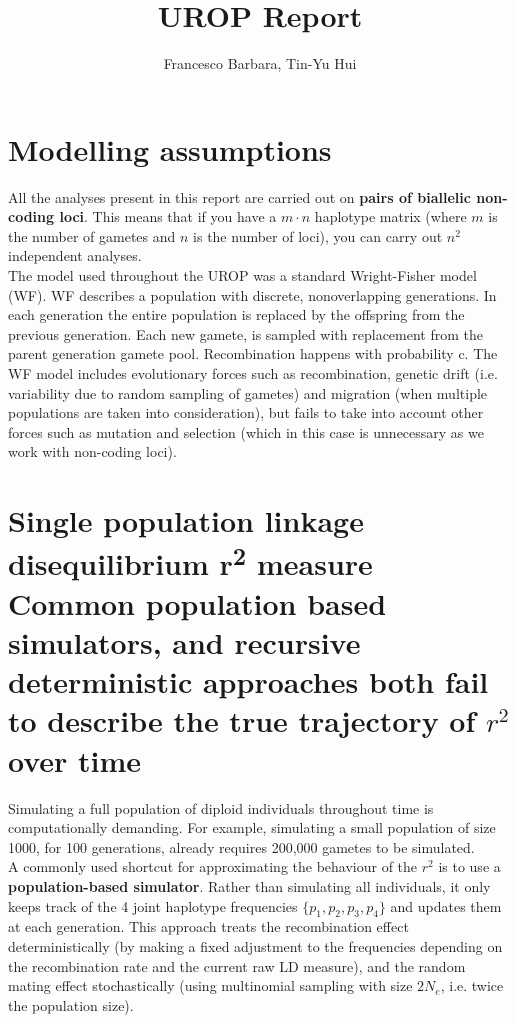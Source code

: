 \documentclass[a4paper,12pt]{article}
\begin{document}
\title{UROP Report}
\author{Francesco Barbara, Tin-Yu Hui}
\maketitle
{}
\section{Modelling assumptions}
All the analyses present in this report are carried out on \textbf{pairs of biallelic non-coding loci}.
This means that if you have a $m\cdot n$ haplotype matrix (where $m$ is the number of gametes and $n$ is the number of loci), you can carry out $n^2$ independent analyses.\\

The model used throughout the UROP was a standard Wright-Fisher model (WF). WF describes a population with discrete, nonoverlapping generations. In each generation the entire population is replaced by the offspring from the previous generation.
Each new gamete, is sampled with replacement from the parent generation gamete pool. Recombination happens with probability c.
The WF model includes evolutionary forces such as recombination,
 genetic drift (i.e. variability due to random sampling of gametes)
 and migration (when multiple populations are taken into consideration), but fails to take into account other forces such as mutation
and selection (which in this case is unnecessary as we work with non-coding loci).




\section[Section Title. Section Subtitle]{Single population linkage disequilibrium r\textsuperscript{2} measure\\ {\small Common population based simulators, and recursive deterministic approaches both fail to describe the true trajectory of $r^{2}$ over time}}
Simulating a full population of diploid individuals throughout time is computationally demanding. For example, simulating a small population of size 1000, for 100 generations, already requires 200,000 gametes to be simulated.\\

A commonly used shortcut  for approximating the behaviour of the $r^2$ is to use a  \textbf{population-based simulator}.
Rather than simulating all individuals, it only keeps track of the 4 joint haplotype frequencies $\{p_1, p_2, p_3,p_4 \}$  and updates them at each generation.
This approach treats the recombination effect deterministically (by making a fixed adjustment to the frequencies depending on the recombination rate and the current raw LD measure), and the random mating effect stochastically (using multinomial sampling with size $2N_e$, i.e. twice the population size).\\
\end{document}
